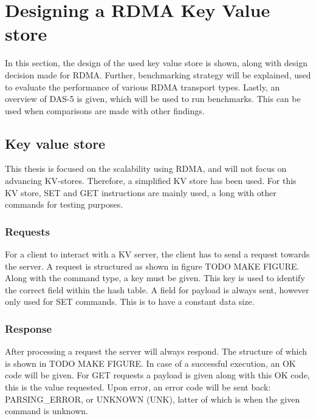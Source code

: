 
\chapter{Designing a RDMA Key Value store}\label{ch:design} %



\ifpdf
    \graphicspath{{7/figures/PNG/}{7/figures/PDF/}{7/figures/}}
\else
    \graphicspath{{7/figures/EPS/}{7/figures/}}
\fi


In this section, the design of the used key value store is shown, along with design decision made for RDMA.
Further, benchmarking strategy will be explained, used to evaluate the performance of various RDMA transport types.
Lastly, an overview of DAS-5 is given, which will be used to run benchmarks.
This can be used when comparisons are made with other findings.

\section{Key value store}
This thesis is focused on the scalability using RDMA, and will not focus on advancing KV-stores.
Therefore, a simplified KV store has been used.
For this KV store, SET and GET instructions are mainly used, a long with other commands for testing purposes.

\subsection{Requests}
For a client to interact with a KV server, the client has to send a request towards the server.
A request is structured as shown in figure TODO MAKE FIGURE.
Along with the command type, a key must be given.
This key is used to identify the correct field within the hash table.
A field for payload is always sent, however only used for SET commands.
This is to have a constant data size.

\subsection{Response}
After processing a request the server will always respond.
The structure of which is shown in TODO MAKE FIGURE.
In case of a successful execution, an OK code will be given.
For GET requests a payload is given along with this OK code, this is the value requested.
Upon error, an error code will be sent back: PARSING\_ERROR, or UNKNOWN (UNK), latter of which is when the given command is unknown.


